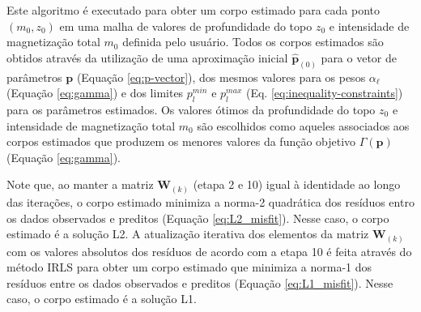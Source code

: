 Este algoritmo é executado para obter um corpo estimado para cada ponto 
$(m_{0}, z_{0})$ em uma malha de valores de profundidade do topo $z_{0}$ e intensidade de magnetização total $m_{0}$ definida pelo usuário. 
Todos os corpos estimados são obtidos através da utilização de uma aproximação inicial $\hat{\mathbf{p}}_{(0)}$ para o vetor de parâmetros
$\mathbf{p}$ (Equação \ref{eq:p-vector}), dos mesmos valores para os pesos
$\alpha_{\ell}$ (Equação \ref{eq:gamma}) e dos limites $p_{l}^{min}$ e 
$p_{l}^{max}$ (Eq. \ref{eq:inequality-constraints}) para os parâmetros estimados.
Os valores ótimos da profundidade do topo $z_{0}$ e intensidade de magnetização total
$m_{0}$ são escolhidos como aqueles associados aos corpos estimados que produzem os menores valores da função objetivo $\Gamma (\mathbf{p})$ (Equação \ref{eq:gamma}).

Note que, ao manter a matriz $\mathbf{W}_{(k)}$ (etapa 2 e 10) igual à identidade ao longo das iterações, o corpo estimado minimiza a norma-2 quadrática dos resíduos entro os dados observados e preditos (Equação \ref{eq:L2_misfit}). 
Nesse caso, o corpo estimado é a solução L2. 
A atualização iterativa dos elementos da matriz $\mathbf{W}_{(k)}$ com os valores absolutos dos resíduos de acordo com a etapa 10 é feita através do método IRLS \citep[][p. 46]{scales_gersztenkorn1988, aster_etal2019} para obter um corpo estimado que minimiza a norma-1 dos resíduos entre os dados observados e preditos 
(Equação \ref{eq:L1_misfit}). Nesse caso, o corpo estimado é a solução L1.